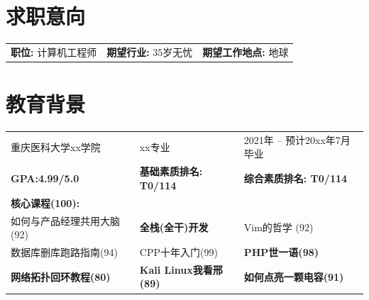 \documentclass[10pt]{article}
\begin{document}
\section{\makebox[\widthof{\faHeart}][c]{\color{CQMU_Green}{\faHeart}}\quad 求职意向}
\vspace{-1em}
\begin{table}[h!]
        \begin{tabularx}{\textwidth}{XXp{}}
            
             \textbf{职位:} 计算机工程师 &\textbf{期望行业:} 35岁无忧& \textbf{期望工作地点:} 地球\\
             
    
        \end{tabularx}

        
    \end{table}
	\section{\makebox[\widthof{\faGraduationCap}][c]{\color{CQMU_Green}{\faGraduationCap}}\quad 教育背景}
	\vspace{-1em}
    \begin{table}[h!]
        \begin{tabularx}{\textwidth}{XXp{}}
            重庆医科大学xx学院 & xx专业 & 2021年 -- 预计20xx年7月毕业\\
             \textbf{GPA:4.99/5.0} & \textbf{基础素质排名: T0/114} & \textbf{综合素质排名: T0/114} \\
             \textbf{核心课程(100):}& & \\
             \small 如何与产品经理共用大脑(92)& \small \textbf{全栈(全干)开发} & \small Vim的哲学 (92) \\
             \small{数据库删库跑路指南(94)} & \small CPP十年入门(99)& \small \textbf{PHP世一语(98)}\\ \small \textbf{网络拓扑回环教程(80)}&\small \textbf{Kali Linux我看邢(89)}&\small \textbf{如何点亮一颗电容(91)}\\
             
    
        \end{tabularx}
        

        
    \end{table}
    
\end{document}
